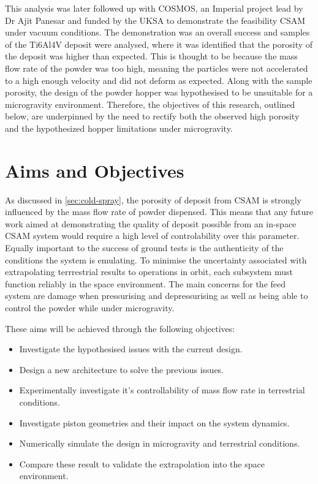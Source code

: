 This analysis was later followed up with COSMOS, an Imperial project lead by Dr Ajit Panesar and funded by the UKSA to demonstrate the feasibility CSAM under vacuum conditions. The demonstration was an overall success and samples of the Ti6Al4V deposit were analysed, where it was identified that the porosity of the deposit was higher than expected. This is thought to be because the mass flow rate of the powder was too high, meaning the particles were not accelerated to a high enough velocity and did not deform as expected. Along with the sample porosity, the design of the powder hopper was hypothesised to be unsuitable for a microgravity environment. Therefore, the objectives of this research, outlined below, are underpinned by the need to rectify both the observed high porosity and the hypothesized hopper limitations under microgravity.

\section{Aims and Objectives}
As discussed in \autoref{sec:cold-spray}, the porosity of deposit from CSAM is strongly influenced by the mass flow rate of powder dispensed. This means that any future work aimed at demonstrating the quality of deposit possible from an in-space CSAM system would require a high level of controlability over this parameter. Equally important to the success of ground tests is the authenticity of the conditions the system is emulating. To minimise the uncertainty associated with extrapolating terrrestrial results to operations in orbit, each subsystem must function reliably in the space environment. The main concerns for the feed system are damage when pressurising and depressurising as well as being able to control the powder while under microgravity.

These aims will be achieved through the following objectives:
\begin{itemize}
    \item Investigate the hypothesised issues with the current design.
    \item Design a new architecture to solve the previous issues.
    \item Experimentally investigate it's controllability of mass flow rate in terrestrial conditions.
    \item Investigate piston geometries and their impact on the system dynamics.
    \item Numerically simulate the design in microgravity and terrestrial conditions.
    \item Compare these result to validate the extrapolation into the space environment. 
\end{itemize}



